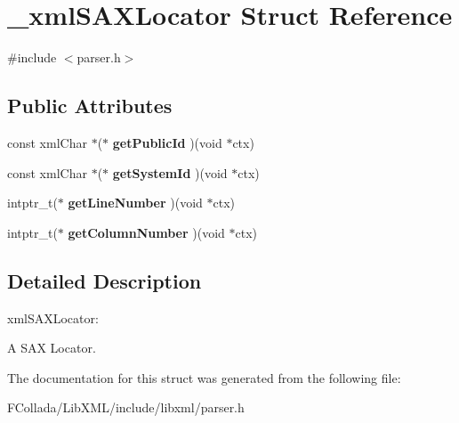 \hypertarget{struct__xmlSAXLocator}{
\section{\_\-xmlSAXLocator Struct Reference}
\label{struct__xmlSAXLocator}
}


{\ttfamily \#include $<$parser.h$>$}

\subsection*{Public Attributes}
\begin{DoxyCompactItemize}
\item 
\hypertarget{struct__xmlSAXLocator_ab1e7db8c0f7b0610f8fbd49bbdf200c6}{
const xmlChar $\ast$($\ast$ {\bfseries getPublicId} )(void $\ast$ctx)}
\label{struct__xmlSAXLocator_ab1e7db8c0f7b0610f8fbd49bbdf200c6}

\item 
\hypertarget{struct__xmlSAXLocator_a53975abd88cfa770adfc465cfc4e0d19}{
const xmlChar $\ast$($\ast$ {\bfseries getSystemId} )(void $\ast$ctx)}
\label{struct__xmlSAXLocator_a53975abd88cfa770adfc465cfc4e0d19}

\item 
\hypertarget{struct__xmlSAXLocator_a16474089fec24e7cf798567d0926b40b}{
intptr\_\-t($\ast$ {\bfseries getLineNumber} )(void $\ast$ctx)}
\label{struct__xmlSAXLocator_a16474089fec24e7cf798567d0926b40b}

\item 
\hypertarget{struct__xmlSAXLocator_a7ac084b998215f57d3c189c4f536d103}{
intptr\_\-t($\ast$ {\bfseries getColumnNumber} )(void $\ast$ctx)}
\label{struct__xmlSAXLocator_a7ac084b998215f57d3c189c4f536d103}

\end{DoxyCompactItemize}


\subsection{Detailed Description}
xmlSAXLocator:

A SAX Locator. 

The documentation for this struct was generated from the following file:\begin{DoxyCompactItemize}
\item 
FCollada/LibXML/include/libxml/parser.h\end{DoxyCompactItemize}

